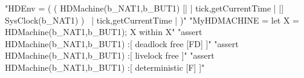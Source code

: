 \begin{assert}
"HDEnv = ( ( HDMachine(b_NAT1,b_BUT1) [| {| tick,getCurrentTime |} |] SysClock(b_NAT1) ) \ {| tick,getCurrentTime |} )"
\also "MyHDMACHINE = let X = HDMachine(b_NAT1,b_BUT1); X within X"
\also "assert HDMachine(b_NAT1,b_BUT1) :[ deadlock free [FD] ]"
\also "assert HDMachine(b_NAT1,b_BUT1) :[ livelock free ]"
\also "assert HDMachine(b_NAT1,b_BUT1) :[ deterministic [F] ]"
\end{assert}
